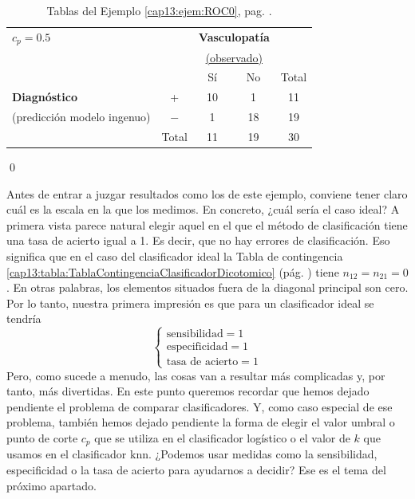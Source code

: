 \begin{Ejemplo}
\begin{table}[btp]
\begin{center}
{\begin{tabular}{lcccc}
         	$c_p=0.5$ &&\multicolumn{2}{c}{\bf Vasculopat\'ia} $Y$&\\
         	&&\multicolumn{2}{c}{\underline{\vspace{.25cm}(observado)}}&\\
         	
         	&          & Sí &  No & Total\\
         	\hline
         	{\bf Diagnóstico} & + & 10 &  1 & 11\\
         	(predicción modelo ingenuo) & $-$ & 1 & 18 & 19\\
         	\hline
         	& Total    & 11& 19 & 30\\
         	\hline
\end{tabular}
}		
\end{center}
		\caption{Tablas del Ejemplo \ref{cap13:ejem:ROC0}, pag. \pageref{cap13:ejem:ROC0}.}
		\label{cap13:tabla:ejemploClasificadorVasculopatia1}
\end{table}

\qed
\end{Ejemplo}
Antes de entrar a juzgar resultados como los de este ejemplo,  conviene tener claro cuál es la escala en la que los medimos. En concreto, ¿cuál sería el caso ideal? A primera vista parece natural elegir aquel en el que el método de clasificación tiene una tasa de acierto igual a 1. Es decir, que no hay errores de clasificación.  Eso significa que en el caso del clasificador ideal la Tabla de contingencia \ref{cap13:tabla:TablaContingenciaClasificadorDicotomico}  (pág. \pageref{cap13:tabla:TablaContingenciaClasificadorDicotomico} ) tiene $n_{12} = n_{21} = 0$. En otras palabras, los elementos  situados fuera de la diagonal principal son cero.  Por lo tanto, nuestra primera impresión es que para un clasificador ideal se tendría
\[
\begin{cases}
\mbox{sensibilidad} = 1\\[4mm]
\mbox{especificidad} = 1\\[4mm]
\mbox{tasa de acierto} = 1
\end{cases}
\]
Pero, como sucede a menudo, las cosas van a resultar más complicadas y, por tanto, más divertidas. En este punto queremos recordar que hemos dejado pendiente el problema de comparar clasificadores. Y, como caso especial de ese problema, también hemos dejado pendiente la forma de elegir el valor umbral o punto de corte $c_p$ que se utiliza en el clasificador logístico o el valor de $k$ que usamos en el clasificador knn. ¿Podemos usar medidas como la sensibilidad, especificidad o la tasa de acierto para ayudarnos a decidir? Ese es el tema del próximo apartado.


